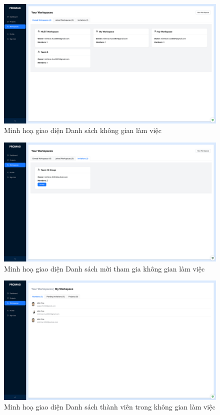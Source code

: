 \documentclass[../DoAn.tex]{subfiles}
\begin{document}
\newpage

\begin{figure}[H]
    \centering
    \includegraphics[width=1.0\linewidth]{Hinhve/Screenshot_WorkspaceList.png}
    \caption{Minh hoạ giao diện Danh sách không gian làm việc}
    \label{fig:Screenshot_WorkspaceList}
\end{figure}

\begin{figure}[H]
    \centering
    \includegraphics[width=1.0\linewidth]{Hinhve/Screenshot_WorkspaceInvite.png}
    \caption{Minh hoạ giao diện Danh sách mời tham gia không gian làm việc}
    \label{fig:Screenshot_WorkspaceInvite}
\end{figure}

\newpage

\begin{figure}[H]
    \centering
    \includegraphics[width=1.0\linewidth]{Hinhve/Screenshot_WorkspaceDetail_Members.png}
    \caption{Minh hoạ giao diện Danh sách thành viên trong không gian làm việc}
    \label{fig:Screenshot_WorkspaceDetail_Members}
\end{figure}
\end{document}
